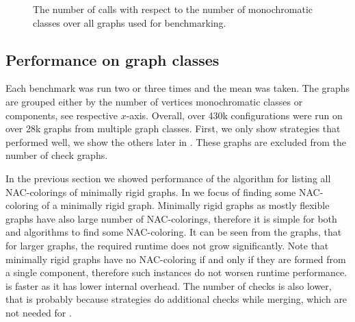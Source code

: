 \begin{figure}[ht]
	\centering
	\scalebox{0.5}{}
	\caption[The number of \IsNACColoring{} calls.]{
		The number of \IsNACColoring{} calls with respect to the number of monochromatic classes
		over all graphs used for benchmarking.}%
	\label{fig:graph_summary}
\end{figure}%






\subsection{Performance on graph classes}%
\label{sec:bench_graph_classes}


Each benchmark was run two or three times and the mean was taken.
The graphs are grouped either by the number of vertices
monochromatic classes or \trcon{} components, see respective \(x\)-axis.
Overall, over 430k configurations were run
on over 28k graphs from multiple graph classes.
First, we only show strategies that performed well,
we show the others later in .
These graphs are excluded from the number of check graphs.

In the previous section we showed performance of the algorithm for listing
all NAC-colorings of minimally rigid graphs.
In 
we focus of finding some NAC-coloring of a minimally rigid graph.
Minimally rigid graphs as mostly flexible graphs have also
large number of NAC-colorings, therefore it is simple for both \NaiveCycles{}
and \Subgraphs{} algorithms to find some NAC-coloring.
It can be seen from the graphs, that for larger graphs, the required runtime
does not grow significantly.
Note that minimally rigid graphs have no NAC-coloring if and only if they are formed from
a single \trcon{} component, therefore such instances do not worsen runtime performance.
\NaiveCycles{} is faster as it has lower internal overhead.
The number of \IsNACColoring{} checks is also lower,
that is probably because \Subgraphs{} strategies do additional checks
while merging, which are not needed for \NaiveCycles{}.

